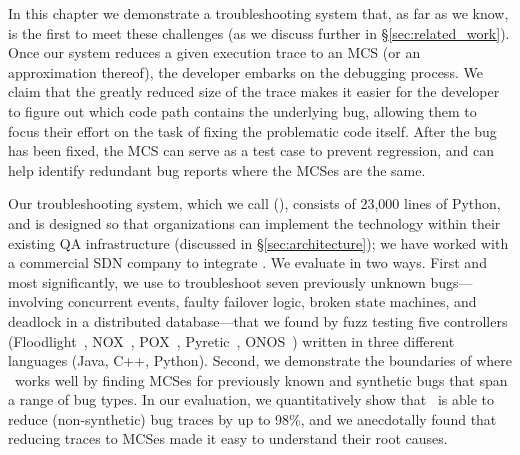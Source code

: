 In this chapter we demonstrate a troubleshooting system that,
as far as we know, is the first to meet these challenges
(as we discuss further in \S\ref{sec:related_work}). %
Once our system reduces a given execution trace to an MCS (or an approximation thereof), the developer embarks
on the debugging process. We claim that the greatly reduced size of the
trace makes it easier for the developer to figure out which code path contains
the underlying bug, allowing them to focus their effort on
the task of fixing the problematic code itself. After the bug has been fixed, the MCS
can serve as a test case to prevent regression,
and can help identify redundant bug reports where the MCSes are the same.

Our troubleshooting system, which we call {\projectname} ({\projectmeaning}),
consists of 23,000 lines of Python, and is designed so that organizations can
implement the technology within their existing QA infrastructure (discussed in
\S\ref{sec:architecture}); we have worked with a
commercial SDN company to integrate \projectname. We evaluate {\projectname} in
two ways. First and most significantly, we use {\projectname} to troubleshoot
seven previously unknown bugs---involving concurrent events,
faulty failover logic, broken state machines,
and deadlock in a distributed database---that we found
by fuzz testing five controllers (Floodlight~\cite{floodlight}, NOX~\cite{nox},
POX~\cite{pox}, Pyretic~\cite{frenetic}, ONOS~\cite{ONOS})
written in three different languages (Java, C++, Python).
Second, we demonstrate the
boundaries of where \projectname~works well by
finding MCSes for previously known and synthetic bugs that span a range of bug
types. In our evaluation, we quantitatively show that \projectname~is able to
reduce (non-synthetic) bug traces by up to 98\%, and we anecdotally found that reducing
traces to MCSes made it easy to understand their root causes.
